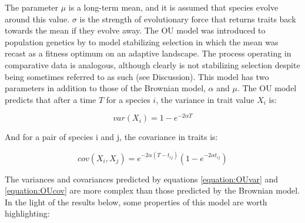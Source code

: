 \documentclass[a4paper,12pt]{article}
\begin{document}
The parameter $\mu$ is a long-term mean, and it is assumed that species evolve around this value. $\sigma$ is the strength of evolutionary force that returns traits back towards the mean if they evolve away. The OU model was introduced to population genetics by \citet{Lande:1976aa} to model stabilizing selection in which the mean was recast as a fitness optimum on an adaptive landscape. The process operating in comparative data is analogous, although clearly is not stabilizing selection despite being sometimes referred to as such (see Discussion). This model has two parameters in addition to those of the Brownian model, $\alpha$ and $\mu$.
The OU model predicts that after a time $T$ for a species $i$, the variance in trait value $X_i$ is:

  \begin{equation}
    var(X_i) = 1 - e^{-2 \alpha T}
    \label{equation:OUvar} 
  \end{equation}

And for a pair of species i and j, the covariance in traits is:

  \begin{equation}
    cov(X_i, X_j) = e^{-2 \alpha (T - t_{ij})} (1 - e^{-2\alpha t_{ij}})
    \label{equation:OUcov} 
  \end{equation}

The variances and covariances predicted by equations \ref{equation:OUvar} and \ref{equation:OUcov} are more complex than those predicted by the Brownian model. In the light of the results below, some properties of this model are worth highlighting:
\end{document}
